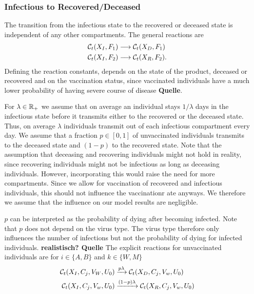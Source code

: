 \subsubsection{Infectious to Recovered/Deceased}
The transition from the infectious state to the recovered or deceased state is independent of any other compartments. The general reactions are
\begin{align}
\label{eq:recovery}
    \mathcal{C}_t(X_I, F_1) & \longrightarrow  \mathcal{C}_t(X_D, F_1) \\
    \mathcal{C}_t(X_I, F_2) & \longrightarrow  \mathcal{C}_t(X_R, F_2). \notag
\end{align}
Defining the reaction constants, depends on the state of the product, deceased or recovered and on the vaccination status, since vaccinated individuals have a much lower probability of having severe course of disease \textbf{Quelle}. 

For $\lambda \in \mathbb{R}_+$ we assume that on average an individual stays $1/\lambda$ days in the infectious state before it transmits either to the recovered or the deceased state. Thus, on average $\lambda$ individuals transmit out of each infectious compartment every day. We assume that a fraction $p \in [0,1]$ of unvaccinated individuals transmits to the deceased state and $(1-p)$ to the recovered state. Note that the assumption that deceasing and recovering individuals might not hold in reality, since recovering individuals might not be infectious as long as deceasing individuals. However, incorporating this would raise the need for more compartments. Since we allow for vaccination of recovered and infectious individuals, this should not influence the vaccinationr ate anyways. We therefore we assume that the influence on our model results are negligible.
 
$p$ can be interpreted as the probability of dying after becoming infected. Note that $p$ does not depend on the virus type. The virus type therefore only influences the number of infections but not the probability of dying for infected individuals. \textbf{realistisch? Quelle} The explicit reactions for unvaccinated individuals are for $i \in \{A, B\}$ and $k \in \{W, M\}$
\begin{align}
    \mathcal{C}_t(X_I, C_j, V_W, U_0) &\xrightarrow{p \lambda} \mathcal{C}_t(X_D,C_j, V_w, U_0)  \\
    \mathcal{C}_t(X_I, C_j, V_w, U_0) &\xrightarrow{(1-p) \lambda} \mathcal{C}_t(X_R,C_j, V_w, U_0) \notag
\end{align}

